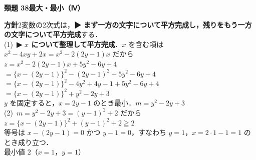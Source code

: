\documentclass[a4paper,11pt]{ltjsarticle}
\newcommand{\ans}[2]{\Needspace{5\baselineskip}\vspace{6pt}%
  {\sffamily\bfseries 類題 #1\quad #2}\par}
\newcommand{\point}[1]{\textsf{\bfseries ▶ #1}}
\begin{document}
\ans{38}{最大・最小（Ⅳ）}
\begin{kai}
\textbf{方針}\quad 2変数の2次式は，\point{まず一方の文字について平方完成し，残りをもう一方の文字について平方完成}する．\\[2pt]
(1)\ \point{$x$ について整理して平方完成}．$x$ を含む項は $x^2-4xy+2x=x^2-2(2y-1)x$ だから\\
\hspace*{1.5em}$z=x^2-2(2y-1)x+5y^2-6y+4$\\
\hspace*{1.5em}$=\{x-(2y-1)\}^2-(2y-1)^2+5y^2-6y+4$\\
\hspace*{1.5em}$=\{x-(2y-1)\}^2-4y^2+4y-1+5y^2-6y+4$\\
\hspace*{1.5em}$=\{x-(2y-1)\}^2+y^2-2y+3$\\
\hspace*{1.5em}$y$ を固定すると，$x=2y-1$ のとき最小．\quad $m=y^2-2y+3$\\[2pt]
(2)\ $m=y^2-2y+3=(y-1)^2+2$ だから\\
\hspace*{1.5em}$z=\{x-(2y-1)\}^2+(y-1)^2+2\geqq2$\\
\hspace*{1.5em}等号は $x-(2y-1)=0$ かつ $y-1=0$，すなわち $y=1$，$x=2\cdot1-1=1$ のとき成り立つ．\\
\hspace*{1.5em}最小値 $2$\quad（$x=1$，$y=1$）
\end{kai}
\end{document}
